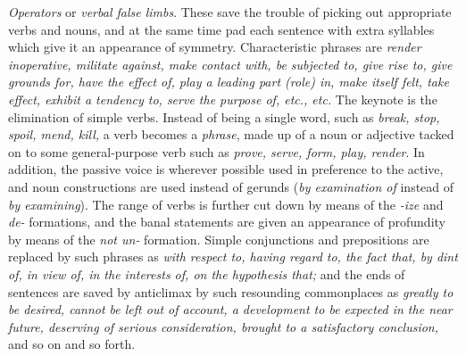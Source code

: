 \documentclass[a4paper]{article}
\begin{document}
\textit{Operators} or \textit{verbal false limbs}. These save the trouble of picking out appropriate verbs and nouns, and at the same time pad each sentence with extra syllables which give it an appearance of symmetry. Characteristic phrases are \textit{render inoperative, militate against, make contact with, be subjected to, give rise to, give grounds for, have the effect of, play a leading part (role) in, make itself felt, take effect, exhibit a tendency to, serve the purpose of, etc., etc.} The keynote is the elimination of simple verbs. Instead of being a single word, such as \textit{break, stop, spoil, mend, kill,} a verb becomes a \textit{phrase}, made up of a noun or adjective tacked on to some general-purpose verb such as \textit{prove, serve, form, play, render}. In addition, the passive voice is wherever possible used in preference to the active, and noun constructions are used instead of gerunds (\textit{by examination of} instead of \textit{by examining}). The range of verbs is further cut down by means of the \textit{-ize} and \textit{de-} formations, and the banal statements are given an appearance of profundity by means of the \textit{not un-} formation. Simple conjunctions and prepositions are replaced by such phrases as \textit{with respect to, having regard to, the fact that, by dint of, in view of, in the interests of, on the hypothesis that;} and the ends of sentences are saved by anticlimax by such resounding commonplaces as \textit{greatly to be desired, cannot be left out of account, a development to be expected in the near future, deserving of serious consideration, brought to a satisfactory conclusion,} and so on and so forth.

\vspace{0.3cm}
\end{document}
